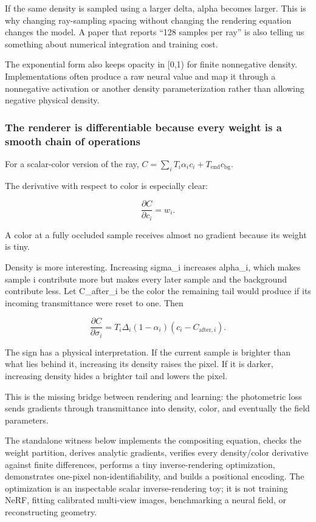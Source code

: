 If the same density is sampled using a larger delta, alpha becomes larger. This is why changing ray-sampling spacing without changing the rendering equation changes the model. A paper that reports ``128 samples per ray'' is also telling us something about numerical integration and training cost.

The exponential form also keeps opacity in {[}0,1) for finite nonnegative density. Implementations often produce a raw neural value and map it through a nonnegative activation or another density parameterization rather than allowing negative physical density.

\subsubsection{The renderer is differentiable because every weight is a smooth chain of operations}\label{04-visual-computing-ii-ch035-the-renderer-is-differentiable-because-every-weight-is-a-smooth-chain-of-operations}

For a scalar-color version of the ray, \(C=\sum_iT_i\alpha_ic_i+T_{\mathrm{end}}c_{\mathrm{bg}}\).

The derivative with respect to color is especially clear:

\[\frac{\partial C}{\partial c_i}=w_i.\]

A color at a fully occluded sample receives almost no gradient because its weight is tiny.

Density is more interesting. Increasing sigma\_i increases alpha\_i, which makes sample i contribute more but makes every later sample and the background contribute less. Let C\_after\_i be the color the remaining tail would produce if its incoming transmittance were reset to one. Then

\[\frac{\partial C}{\partial\sigma_i}=T_i\Delta_i(1-\alpha_i)(c_i-C_{\mathrm{after},i}).\]

The sign has a physical interpretation. If the current sample is brighter than what lies behind it, increasing its density raises the pixel. If it is darker, increasing density hides a brighter tail and lowers the pixel.

This is the missing bridge between rendering and learning: the photometric loss sends gradients through transmittance into density, color, and eventually the field parameters.

The standalone witness below implements the compositing equation, checks the weight partition, derives analytic gradients, verifies every density/color derivative against finite differences, performs a tiny inverse-rendering optimization, demonstrates one-pixel non-identifiability, and builds a positional encoding. The optimization is an inspectable scalar inverse-rendering toy; it is not training NeRF, fitting calibrated multi-view images, benchmarking a neural field, or reconstructing geometry.

